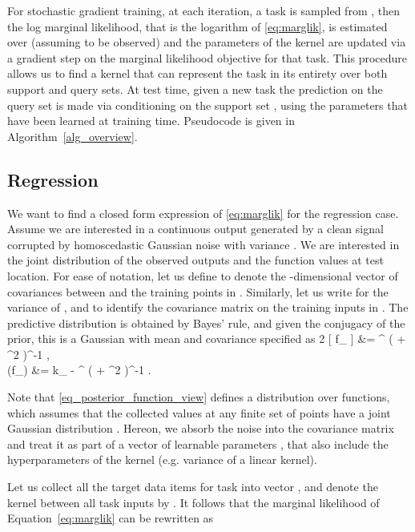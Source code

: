 \documentclass{article}
\begin{document}
For stochastic gradient training, at each iteration, a task  is sampled from , then the log marginal likelihood, that is the logarithm of \eqref{eq:marglik}, is estimated over  (assuming  to be observed) and the parameters of the kernel are updated via a gradient step on the marginal likelihood objective for that task. This procedure allows us to find a kernel that can represent the task in its entirety over both support and query sets. At test time, given a new task  the prediction on the query set  is made via conditioning on the support set , using the parameters that have been learned at training time. Pseudocode is given in Algorithm~\ref{alg_overview}.


\subsection{Regression}
We want to find a closed form expression of \eqref{eq:marglik} for the regression case. Assume we are interested in a continuous output  generated by a clean signal  corrupted by homoscedastic Gaussian noise  with variance . We are interested in the joint distribution of the observed outputs and the function values at test location. For ease of notation, let us define  to denote the -dimensional vector of covariances between  and the  training points in . Similarly, let us write  for the variance of , and  to identify the covariance matrix on the training inputs in . The predictive distribution  is obtained by Bayes' rule, and given the conjugacy of the prior, this is a Gaussian with mean and covariance specified as
{2}
  [ f_{\ast} ] &= 
 ^{\top} ( + \sigma^2 )^{-1} ,\\
 (f_{\ast}) &= k_{\ast \ast} - ^{\top} ( + \sigma^2 )^{-1} 
 .
 
Note that \eqref{eq_posterior_function_view} defines a distribution over functions, which assumes that the collected values at any finite set of points have a joint Gaussian distribution \citep{rasmussen2006gaussian}. Hereon, we absorb the noise  into the covariance matrix  and treat it as part of a vector of learnable parameters , that also include the hyperparameters of the kernel (e.g. variance of a linear kernel). 

Let us collect all the target data items for task  into vector , and denote the kernel between all task inputs by . It follows that the marginal likelihood of Equation~\eqref{eq:marglik} can be rewritten as
\end{document}
